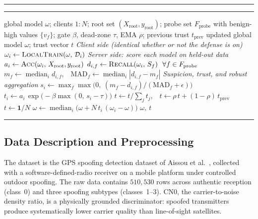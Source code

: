 \documentclass[journal]{IEEEtran}
\begin{document}
\begin{algorithm}[!t]
\hrule\vspace{3pt}
\caption{One federated round with the behavioral-trust defense}
\label{alg:defense}
\vspace{2pt}\hrule\vspace{4pt}
\begin{algorithmic}[1]
\Require global model $\omega$; clients $1{:}N$; root set $(X_{\mathrm{root}},y_{\mathrm{root}})$; probe set $F_{\mathrm{probe}}$ with benign-high values $\{v_f\}$; gate $\beta$, dead-zone $\tau$, EMA $\rho$; previous trust $t_{\mathrm{prev}}$
\Ensure updated global model $\omega$; trust vector $t$
\Statex
\State \textit{Client side (identical whether or not the defense is on)}
    \State $\omega_i \gets \textsc{LocalTrain}(\omega,\, \mathcal{D}_i)$
\EndFor
\Statex
\State \textit{Server side: score each model on held-out data}
    \State $a_i \gets \textsc{Acc}(\omega_i,\, X_{\mathrm{root}}, y_{\mathrm{root}})$
    \State $d_{i,f} \gets \textsc{Recall}(\omega_i,\, S_f)\ \ \forall f \in F_{\mathrm{probe}}$ 
\EndFor
{}
    \State $m_f \gets \operatorname{median}_i d_{i,f}$,\ \ $\mathrm{MAD}_f \gets \operatorname{median}_i |d_{i,f}\!-\!m_f|$
\EndFor
\Statex
\State \textit{Suspicion, trust, and robust aggregation}
    \State $s_i \gets \max_{f}\max\!\big(0,\ (m_f\!-\!d_{i,f})/(\mathrm{MAD}_f\!+\!\epsilon)\big)$
    \State $t_i \gets a_i\,\exp\!\big(\!-\beta\max(0,\, s_i\!-\!\tau)\big)$
\EndFor
\State $t \gets t / \textstyle\sum_j t_j$,\ \ $t \gets \rho\,t + (1-\rho)\,t_{\mathrm{prev}}$
    \State $t \gets \mathbf{1}/N$ 
\EndIf
\State $\omega \gets \operatorname{median}_i\big(\omega + N\,t_i\,(\omega_i - \omega)\big)$
\State \Return $\omega,\ t$
\end{algorithmic}
\vspace{3pt}\hrule
\end{algorithm}

\subsection{Data Description and Preprocessing}
\label{subsec:data}
The dataset is the GPS spoofing detection dataset of Aissou et al.~\cite{aissou2022dataset}, collected with a software-defined-radio receiver on a mobile platform under controlled outdoor spoofing. The raw data contains $510{,}530$ rows across authentic reception (class~0) and three spoofing subtypes (classes~1--3). CN0, the carrier-to-noise density ratio, is a physically grounded discriminator: spoofed transmitters produce systematically lower carrier quality than line-of-sight satellites.
\end{document}
